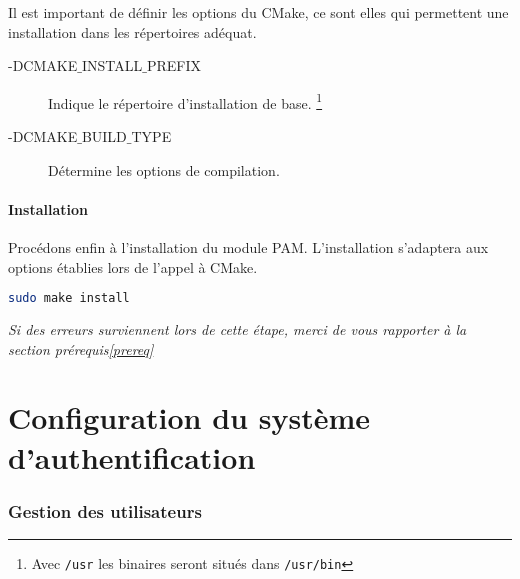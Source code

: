 \documentclass{"../../../res/univ-projet"}
\begin{document}
Il est important de définir les options du CMake, ce sont elles qui permettent une installation dans les
répertoires adéquat.
\begin{description}
\item[-DCMAKE$\_$INSTALL$\_$PREFIX] Indique le répertoire d'installation de base. 
\footnote{Avec \verb?/usr? les binaires seront situés dans \verb?/usr/bin?}
\item[-DCMAKE$\_$BUILD$\_$TYPE] Détermine les options de compilation.
\end{description}

\subsection{Installation}
Procédons enfin à l'installation du module PAM. L'installation s'adaptera 
aux options établies lors de l'appel à CMake.
\begin{lstlisting}[language=bash, backgroundcolor=\color{black}, basicstyle=\color{white}]
sudo make install
\end{lstlisting}

\textit{Si des erreurs surviennent lors de cette étape, merci de vous 
rapporter à la section prérequis\ref{prereq}}


\newpage

\part{Configuration du système d'authentification}
\section{Gestion des utilisateurs}
\end{document}
